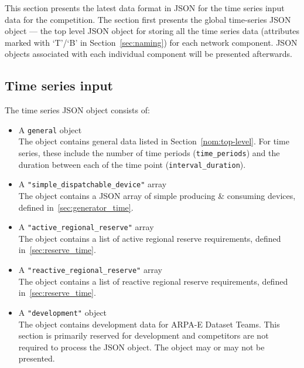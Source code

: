 \label{sec:time_series}
This section presents the latest data format in JSON for the
time series input data for the competition.
The section first presents the global time-series JSON object --- the
top level JSON object for storing all the time series data
(attributes marked with `T'/`B' in Section~\ref{sec:naming})
for each network component.
JSON objects associated with each individual component will be presented afterwards.


\subsection{Time series input}
\label{sec:input_data}
The time series JSON object consists of:
\begin{itemize}
    \item A \texttt{general} object\\
    The object contains general data listed
    in Section~\ref{nom:top-level}.
    For time series, these include the number of time periods (\texttt{time\_periods}) and the duration
    between each of the time point (\texttt{interval\_duration}).
    \item A \texttt{"simple\_dispatchable\_device"} array\\
    The object contains a JSON array of simple producing \& consuming devices, defined in~\ref{sec:generator_time}.
    \item A \texttt{"active\_regional\_reserve"} array\\
    The object contains a list of active regional reserve requirements, defined in~\ref{sec:reserve_time}.
    \item A \texttt{"reactive\_regional\_reserve"} array\\
    The object contains a list of reactive regional reserve requirements, defined in~\ref{sec:reserve_time}.
    \item A \texttt{"development"} object\\
    The object contains development data for ARPA-E Dataset Teams. This section is primarily reserved for development and competitors are not required to process the JSON object. The object may or may not be presented.
\end{itemize}

